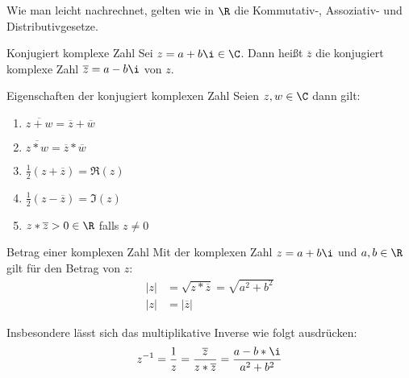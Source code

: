 \bemerkung
Wie man leicht nachrechnet, gelten wie in $\R$ die Kommutativ-, Assoziativ- und Distributivgesetze.

\begin{definition}{Konjugiert komplexe Zahl}
	Sei $z=a+b\i\in\C$. Dann heißt $\overline z$ die konjugiert komplexe Zahl $\overline z=a-b\i$ von $z$.
\end{definition}

\begin{satz}{Eigenschaften der konjugiert komplexen Zahl}
  Seien $z,w\in\C$ dann gilt:
  \begin{enumerate}
    \item $\overline{z+w}=\overline z+\overline w$
    \item $\overline{z* w}=\overline z * \overline w$
    \item $\frac 1 2 (z+\overline z)=\Re(z)$
    \item $\frac 1 2 (z-\overline z)=\Im(z)$
    \item $z* \overline z > 0 \in\R$ falls $z\neq0$
  \end{enumerate}
\end{satz}

\begin{definition}{Betrag einer komplexen Zahl}
	Mit der komplexen Zahl $z=a+b\i$ und $a,b\in\R$ gilt für den Betrag von $z$:
	\begin{align*}
	  |z|&=\sqrt{z*\overline z}=\sqrt{a^2+b^2}\\
	  |z|&=|\overline z|
	\end{align*}
\end{definition}

Insbesondere lässt sich das multiplikative Inverse wie folgt ausdrücken:
\begin{equation*}
  z^{-1}=\frac 1 z=\frac{\overline z}{z*\overline z}=\frac{a-b*\i}{a^2+b^2}
\end{equation*}

